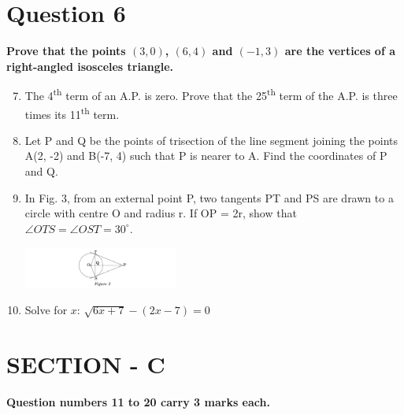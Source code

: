 \documentclass[a4paper,12pt]{article}
\begin{document}
\vspace{0.5cm}

\section*{Question 6}
\textbf{Prove that the points $(3, 0)$, $(6, 4)$ and $(-1, 3)$ are the vertices of a right-angled isosceles triangle.}
\begin{enumerate}
\setcounter{enumi}{6}
\item The 4\textsuperscript{th} term of an A.P. is zero. Prove that the 25\textsuperscript{th} term of the A.P. is three times its 11\textsuperscript{th} term.
    
    \item Let P and Q be the points of trisection of the line segment joining the points A(2, -2) and B(-7, 4) such that P is nearer to A. Find the coordinates of P and Q.
    
    \item In Fig. 3, from an external point P, two tangents PT and PS are drawn to a circle with centre O and radius r. If OP = 2r, show that $\angle OTS = \angle OST = 30^\circ$.
    
    \begin{center}
        \includegraphics[width=0.4\textwidth]{q9.png} %
        \\
    \end{center}
    
    \item Solve for $x$: \quad $\sqrt{6x + 7} - (2x - 7) = 0$
\end{enumerate}

\section*{SECTION - C}
\textbf{Question numbers 11 to 20 carry 3 marks each.}
\end{document}

